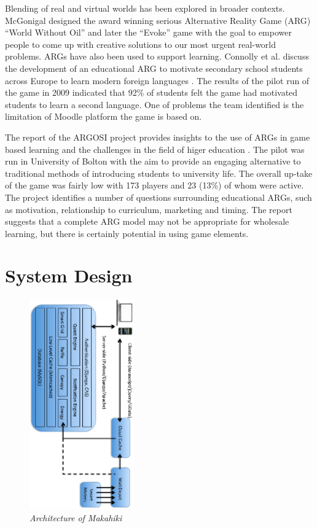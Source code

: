\documentclass{acm_proc_article-sp}
\begin{document}
Blending of real and virtual worlds has been explored in broader contexts. 
McGonigal designed the award winning serious Alternative Reality Game (ARG) 
``World Without Oil'' \cite{worldwithoutoil} and later the ``Evoke''
 \cite{urgentevoke} game with the goal to empower people to come up with
creative solutions to our most urgent real-world problems. ARGs have also been
used to support learning. Connolly et al. discuss the development of an 
educational ARG to motivate secondary school students across Europe to learn 
modern foreign languages \cite{connolly2009arguing}. The results of the pilot 
run of the game in 2009 indicated that 92\% of students felt the game had  
motivated students to learn a second language. One of problems
the team identified is the limitation of Moodle platform the game is based on.

The report of the ARGOSI project provides insights to the use of ARGs in game
based learning and the challenges in the field of higer education
\cite{whitton2009alternate}. The pilot was run in University of Bolton with 
the aim to provide an engaging alternative to traditional methods of 
introducing students to university life. The overall up-take of the game was 
fairly low with 173 players and 23 (13\%) of whom were active. The project
identifies a number of questions surrounding educational ARGs, such as 
motivation, relationship to curriculum, marketing and timing. The report 
suggests that a complete ARG model may not be appropriate for wholesale
learning, but there is certainly potential in using game elements.

\section{System Design}
\begin{figure}[t!]
  \center
  \includegraphics[width=0.4\textwidth, angle=90]{makahiki-architecture.eps}
  \caption{\em \small Architecture of Makahiki}
  \label{fig:MakahikiArchitecture}
\end{figure}
\end{document}
